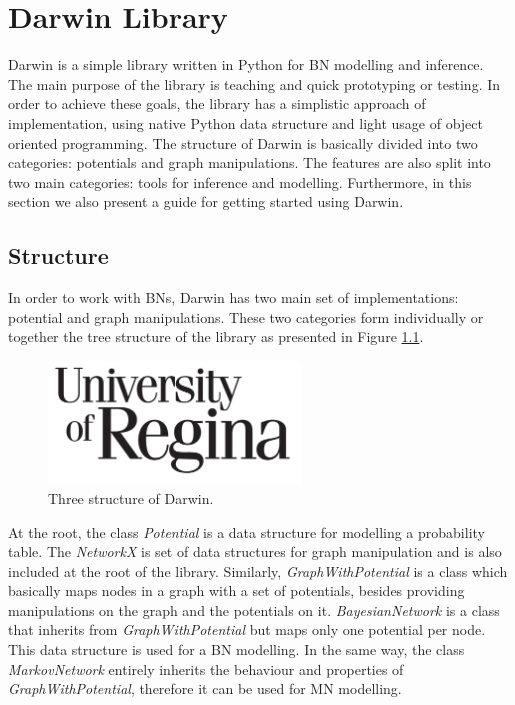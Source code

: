 \chapter{Darwin Library}
\label{sec:darwin_lib}

Darwin is a simple library written in Python for BN modelling and inference.
The main purpose of the library is teaching and quick prototyping or testing.
In order to achieve these goals, the library has a simplistic approach of implementation, using native Python data structure and light usage of object oriented programming.
The structure of Darwin is basically divided into two categories: potentials and graph manipulations.
The features are also split into two main categories: tools for inference and modelling.
Furthermore, in this section we also present a guide for getting started using Darwin.

\section{Structure}
\label{sec:system:sec1}

In order to work with BNs, Darwin has two main set of implementations: potential and graph manipulations.
These two categories form individually or together the tree structure of the library as presented in Figure \ref{fig:tree_darwin}.

\begin{figure}[hbt]
    \begin{center}
        \includegraphics[width=0.6\textwidth]{img/logo_uofr_black}
    \end{center}
    \caption{Three structure of Darwin.}
    \label{fig:tree_darwin}
\end{figure}

At the root, the class \emph{Potential} is a data structure for modelling a probability table.
The \emph{NetworkX} \cite{hagberg-2008-exploring} is set of data structures for graph manipulation and is also included at the root of the library.
Similarly, \emph{GraphWithPotential} is a class which basically maps nodes in a graph with a set of potentials, besides providing manipulations on the graph and the potentials on it.
\emph{BayesianNetwork} is a class that inherits from \emph{GraphWithPotential} but maps only one potential per node.
This data structure is used for a BN modelling.
In the same way, the class \emph{MarkovNetwork} entirely inherits the behaviour and properties of \emph{GraphWithPotential}, therefore it can be used for MN modelling.


